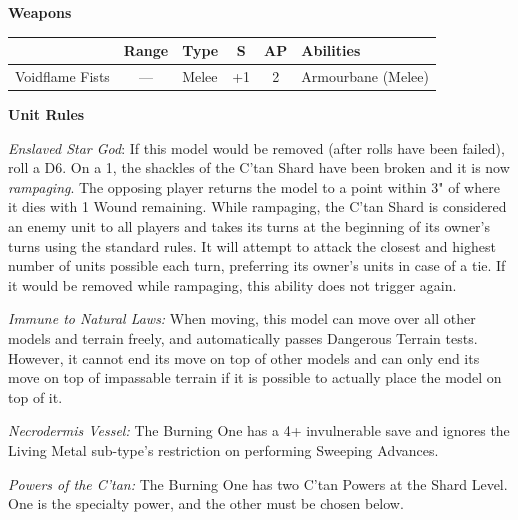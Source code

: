 \begin{minipage}[t]{0.72\textwidth}
	\vspace*{2em}
	\textbf{Weapons}
	
	\begin{tabular}{L{90 pt} c C{40pt} *{2}{c} >{\raggedright\arraybackslash}p{130pt}}
		& Range & Type & S & AP & Abilities \\
		\hline
		Voidflame Fists & — & Melee & +1 & 2 & Armourbane (Melee) \\
	\end{tabular}
	
	\vspace*{2em}
	\textbf{Unit Rules}
	
	\textit{Enslaved Star God}: If this model would be removed (after  rolls have been failed), roll a D6. On a 1, the shackles of the C'tan Shard have been broken and it is now \textit{rampaging}. The opposing player returns the model to a point within 3" of where it dies with 1 Wound remaining. While rampaging, the C'tan Shard is considered an enemy unit to all players and takes its turns at the beginning of its owner's turns using the standard rules. It will attempt to attack the closest and highest number of units possible each turn, preferring its owner's units in case of a tie. If it would be removed while rampaging, this ability does not trigger again.
		
	\textit{Immune to Natural Laws:} When moving, this model can move over all other models and terrain freely, and automatically passes Dangerous Terrain tests. However, it cannot end its move on top of other models and can only end its move on top of impassable terrain if it is possible to actually place the model on top of it.
	
	\textit{Necrodermis Vessel:} The Burning One has a 4+ invulnerable save and ignores the Living Metal sub-type's restriction on performing Sweeping Advances.
	
	\textit{Powers of the C'tan:} The Burning One has two C'tan Powers at the Shard Level. One is the  specialty power, and the other must be chosen below.
	

\end{minipage}
